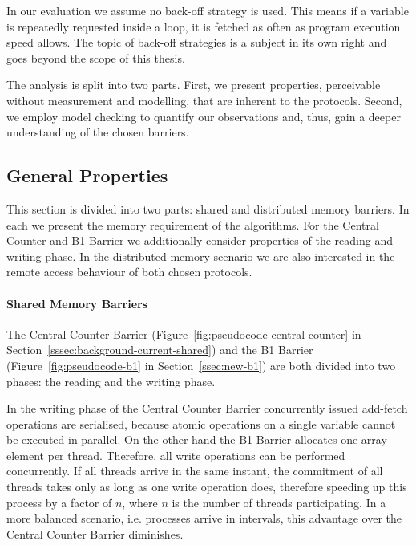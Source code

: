 \documentclass[a4paper, 10pt]{article}
\begin{document}
In our evaluation we assume no back-off strategy is used. This means if a variable is repeatedly requested inside a loop, it is fetched as often as program execution speed allows. The topic of back-off strategies is a subject in its own right and goes beyond the scope of this thesis.

The analysis is split into two parts. First, we present properties, perceivable without measurement and modelling, that are inherent to the protocols. Second, we employ model checking to quantify our observations and, thus, gain a deeper understanding of the chosen barriers.

\subsection{General Properties}
\label{sssec:analysis-general}
This section is divided into two parts: shared and distributed memory barriers.
In each we present the memory requirement of the algorithms.
For the Central Counter and B1 Barrier we additionally consider properties of the reading and writing phase.
In the distributed memory scenario we are also interested in the remote access behaviour of both chosen protocols.

\paragraph{Shared Memory Barriers}
\label{sssec:analysis-general-shared}

The Central Counter Barrier (Figure~\ref{fig:pseudocode-central-counter} in Section~\ref{sssec:background-current-shared}) and the B1 Barrier (Figure~\ref{fig:pseudocode-b1} in Section~\ref{ssec:new-b1}) are both divided into two phases: the reading and the writing phase.

In the writing phase of the Central Counter Barrier concurrently issued add-fetch operations are serialised, because atomic operations on a single variable cannot be executed in parallel. On the other hand the B1 Barrier allocates one array element per thread. Therefore, all write operations can be performed concurrently. If all threads arrive in the same instant, the commitment of all threads takes only as long as one write operation does, therefore speeding up this process by a factor of $n$, where $n$ is the number of threads participating. In a more balanced scenario, i.e. processes arrive in intervals, this advantage over the Central Counter Barrier diminishes.
\end{document}
